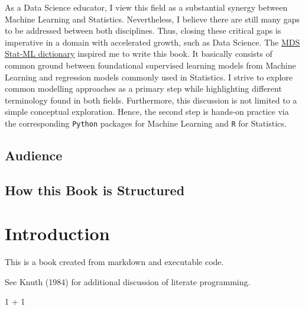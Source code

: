 \documentclass[
  letterpaper,
  DIV=11,
  numbers=noendperiod]{scrreprt}
\newenvironment{Shaded}{\begin{snugshade}}{\end{snugshade}}
\newcommand{\DecValTok}[1]{\textcolor[rgb]{0.68,0.00,0.00}{#1}}
\newcommand{\SpecialCharTok}[1]{\textcolor[rgb]{0.37,0.37,0.37}{#1}}
\begin{document}
As a Data Science educator, I view this field as a substantial synergy
between Machine Learning and Statistics. Nevertheless, I believe there
are still many gaps to be addressed between both disciplines. Thus,
closing these critical gaps is imperative in a domain with accelerated
growth, such as Data Science. The
\href{https://ubc-mds.github.io/resources_pages/terminology/}{MDS
Stat-ML dictionary} inspired me to write this book. It basically
consists of common ground between foundational supervised learning
models from Machine Learning and regression models commonly used in
Statistics. I strive to explore common modelling approaches as a primary
step while highlighting different terminology found in both fields.
Furthermore, this discussion is not limited to a simple conceptual
exploration. Hence, the second step is hands-on practice via the
corresponding \texttt{Python} packages for Machine Learning and
\texttt{R} for Statistics.

\hypertarget{audience}{%
\section*{Audience}\label{audience}}


\hypertarget{how-this-book-is-structured}{%
\section*{How this Book is
Structured}\label{how-this-book-is-structured}}



\hypertarget{introduction}{%
\chapter{Introduction}\label{introduction}}

This is a book created from markdown and executable code.

See Knuth (1984) for additional discussion of literate programming.

\begin{Shaded}
\begin{Highlighting}[]
\DecValTok{1} \SpecialCharTok{+} \DecValTok{1}
\end{Highlighting}
\end{Shaded}
\end{document}
